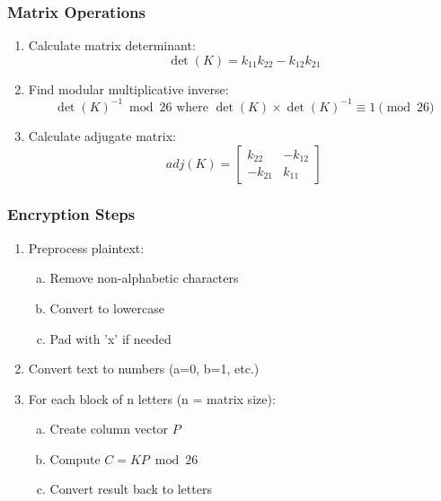 \documentclass[titlepage]{article}
\begin{document}
\subsubsection{Matrix Operations}
\begin{enumerate}[1.]
\item Calculate matrix determinant:
   \begin{equation}
   \det(K) = k_{11}k_{22} - k_{12}k_{21}
   \end{equation}
\item Find modular multiplicative inverse:
   \begin{equation}
   \det(K)^{-1} \bmod 26 \text{ where } \det(K) \times \det(K)^{-1} \equiv 1 \pmod{26}
   \end{equation}
\item Calculate adjugate matrix:
   \begin{equation}
   adj(K) = \begin{bmatrix} 
   k_{22} & -k_{12} \\
   -k_{21} & k_{11}
   \end{bmatrix}
   \end{equation}
\end{enumerate}

\subsubsection{ Encryption Steps}
\begin{enumerate}[1.]
\item Preprocess plaintext:
   \begin{enumerate}[a)]
   \item Remove non-alphabetic characters
   \item Convert to lowercase
   \item Pad with 'x' if needed
   \end{enumerate}
\item Convert text to numbers (a=0, b=1, etc.)
\item For each block of n letters (n = matrix size):
   \begin{enumerate}[a)]
   \item Create column vector $P$
   \item Compute $C = KP \bmod 26$
   \item Convert result back to letters
   \end{enumerate}
\end{enumerate}
\end{document}
